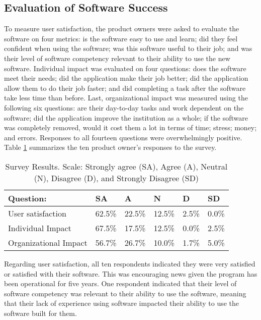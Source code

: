 \subsection{Evaluation of Software Success}
 To measure user satisfaction, the product owners were asked to evaluate the software on four metrics: is the software easy to use and learn; did they feel confident when using the software; was this software useful to their job; and was their level of software competency relevant to their ability to use the new software. Individual impact was evaluated on four questions: does the software meet their needs; did the application make their job better; did the application allow them to do their job faster; and did completing a task after the software take less time than before. Last, organizational impact was measured using the following six questions: are their day-to-day tasks and work dependent on the software; did the application improve the institution as a whole; if the software was completely removed, would it cost them a lot in terms of time;  stress;  money; and errors. Responses to all fourteen questions were overwhelmingly positive. Table \ref{tab:surveyResults} summarizes the ten product owner's responses to the survey. 

\begin{table}
\caption{Survey Results. Scale: Strongly agree (SA), Agree (A), Neutral (N), Disagree (D), and Strongly Disagree (SD)}
\label{tab:surveyResults}
\begin{tabular}{p{3.0cm}p{.6cm}p{.6cm}p{.6cm}p{.6cm}p{.6cm}}
Question: & SA & A & N & D & SD \\
 \hline
User satisfaction & 62.5\% & 22.5\% & 12.5\% & 2.5\% & 0.0\% \\
Individual Impact & 67.5\% & 17.5\% & 12.5\% & 0.0\% & 2.5\% \\
Organizational Impact & 56.7\% & 26.7\% & 10.0\% & 1.7\% & 5.0\% \\
\end{tabular}
\end{table}

Regarding user satisfaction, all ten respondents indicated they were very satisfied or satisfied with their software. This was encouraging news given the program has been operational for five years. One respondent indicated that their level of software competency was relevant to their ability to use the software, meaning that their lack of experience using software impacted their ability to use the software built for them. 

